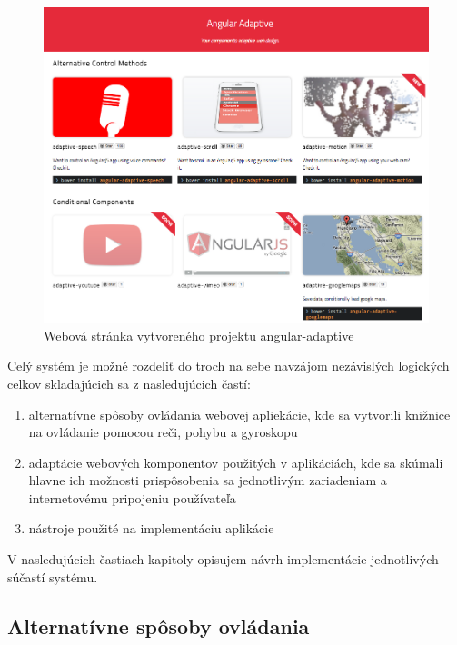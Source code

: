 \begin{figure}[H]
  \centering
  \includegraphics[width=1.0\textwidth]{img/angularadaptive.png}
  \caption[Webová stránka vytvoreného projektu angular-adaptive]{
    Webová stránka vytvoreného projektu angular-adaptive}
  \label{fig: angularadaptive}
\end{figure}

\newpage
Celý systém je možné rozdeliť do troch na sebe navzájom nezávislých logických celkov skladajúcich sa z nasledujúcich častí:

\begin{enumerate}
  \item alternatívne spôsoby ovládania webovej apliekácie, kde sa vytvorili knižnice na ovládanie pomocou reči, pohybu a gyroskopu
  \item adaptácie webových komponentov použitých v aplikáciách, kde sa skúmali hlavne ich možnosti prispôsobenia sa jednotlivým zariadeniam a internetovému pripojeniu používateľa
  \item nástroje použité na implementáciu aplikácie
\end{enumerate}

V nasledujúcich častiach kapitoly opisujem návrh implementácie jednotlivých súčastí systému.

\subsection{Alternatívne spôsoby ovládania} %
\label{sub:alternat_vne_sp_soby_ovl_dania}

